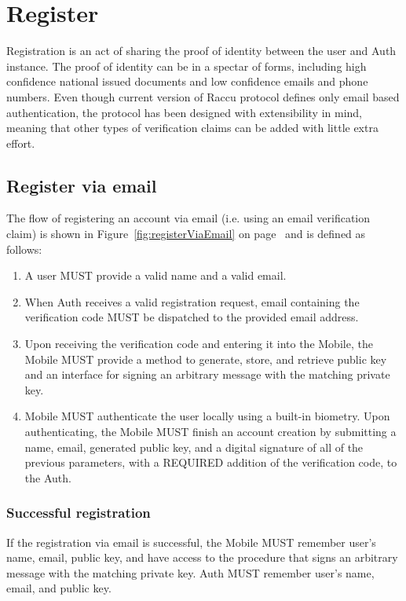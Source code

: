 \section{Register}
Registration is an act of sharing the proof of identity between the user and Auth instance. The proof of identity
can be in a spectar of forms, including high confidence national issued documents and low confidence emails and 
phone numbers. Even though current version of Raccu protocol defines only email based authentication, the protocol
has been designed with extensibility in mind, meaning that other types of verification claims can be added with
little extra effort.

      \subsection{Register via email}
      The flow of registering an account via email (i.e. using an email verification claim) is shown in 
      Figure~\ref{fig:registerViaEmail} on page~\pageref{fig:registerViaEmail} and is defined as follows:
      \begin{enumerate}
            \item A user MUST provide a valid name and a valid email.
            \item When Auth receives a valid registration request, email containing the verification code MUST 
                  be dispatched to the provided email address.
            \item Upon receiving the verification code and entering it into the Mobile, the Mobile MUST provide 
                  a method to generate, store, and retrieve public key and an interface for signing an arbitrary 
                  message with the matching private key.
            \item Mobile MUST authenticate the user locally using a built-in biometry. Upon authenticating, 
                  the Mobile MUST finish an account creation by submitting a name, email, generated public key, 
                  and a digital signature of all of the previous parameters, with a REQUIRED addition of the 
                  verification code, to the Auth.
      \end{enumerate}
                 
      
            \subsubsection{Successful registration}
            If the registration via email is successful, the Mobile MUST remember user's name, email, public key, and 
            have access to the procedure that signs an arbitrary message with the matching private key. Auth MUST 
            remember user's name, email, and public key.

